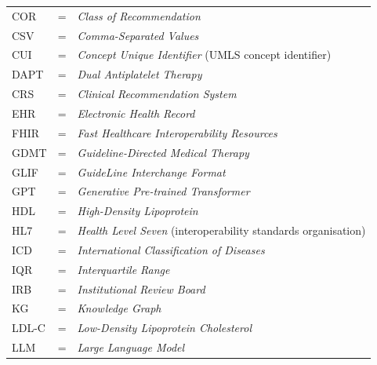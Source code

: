 \begin{longtable}{llp{3.6in}}
	COR     & \hspace{1cm} = & \emph{Class of Recommendation} \\
	CSV     & \hspace{1cm} = & \emph{Comma-Separated Values} \\
	CUI     & \hspace{1cm} = & \emph{Concept Unique Identifier} (UMLS concept identifier) \\
	DAPT    & \hspace{1cm} = & \emph{Dual Antiplatelet Therapy} \\
	CRS     & \hspace{1cm} = & \emph{Clinical Recommendation System} \\
	EHR     & \hspace{1cm} = & \emph{Electronic Health Record} \\
	FHIR    & \hspace{1cm} = & \emph{Fast Healthcare Interoperability Resources} \\
	GDMT    & \hspace{1cm} = & \emph{Guideline-Directed Medical Therapy} \\
	GLIF    & \hspace{1cm} = & \emph{GuideLine Interchange Format} \\
	GPT     & \hspace{1cm} = & \emph{Generative Pre-trained Transformer} \\
	HDL     & \hspace{1cm} = & \emph{High-Density Lipoprotein} \\
	HL7     & \hspace{1cm} = & \emph{Health Level Seven} (interoperability standards organisation) \\
	ICD     & \hspace{1cm} = & \emph{International Classification of Diseases} \\
	IQR     & \hspace{1cm} = & \emph{Interquartile Range} \\
	IRB     & \hspace{1cm} = & \emph{Institutional Review Board} \\
	KG      & \hspace{1cm} = & \emph{Knowledge Graph} \\
	LDL-C   & \hspace{1cm} = & \emph{Low-Density Lipoprotein Cholesterol} \\
	LLM     & \hspace{1cm} = & \emph{Large Language Model} \\

\end{longtable}
